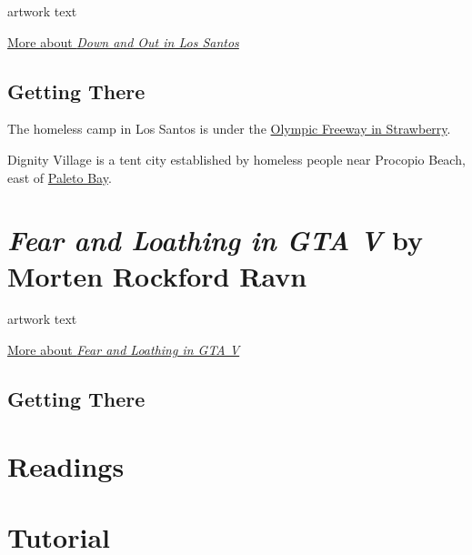 \documentclass[
  openany]{book}
\begin{document}
artwork text

\href{http://www.alanbutler.info/down-and-out-in-los-santos-2016}{More about \emph{Down and Out in Los Santos}}

\hypertarget{getting-there-1}{%
\subsection*{Getting There}\label{getting-there-1}}

The homeless camp in Los Santos is under the \href{https://grandtheftdata.com/landmarks/\#252.086,-1208.975,5,hybrid,name,Strawberry_Subway_Station,_Downtown}{Olympic Freeway in Strawberry}.

Dignity Village is a tent city established by homeless people near Procopio Beach, east of \href{https://grandtheftdata.com/landmarks/\#-171.667,6208.676,5,hybrid,name=paleto_bay,Belinda_May's_Beauty_Salon,_Paleto_Blvd,_Paleto_Bay}{Paleto Bay}.

\hypertarget{fear-and-loathing-in-gta-v-by-morten-rockford-ravn}{%
\section*{\texorpdfstring{\emph{Fear and Loathing in GTA V} by Morten Rockford Ravn}{Fear and Loathing in GTA V by Morten Rockford Ravn}}\label{fear-and-loathing-in-gta-v-by-morten-rockford-ravn}}

artwork text

\href{https://fearandloathingingtav.tumblr.com/}{More about \emph{Fear and Loathing in GTA V}}

\hypertarget{getting-there-2}{%
\subsection*{Getting There}\label{getting-there-2}}

\hypertarget{readings-1}{%
\section*{Readings}\label{readings-1}}

\hypertarget{tutorial-1}{%
\section*{Tutorial}\label{tutorial-1}}
\end{document}
